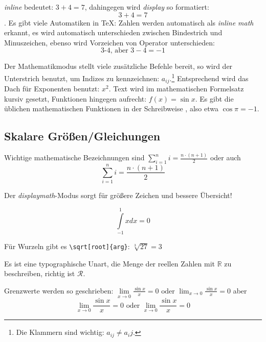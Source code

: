 \documentclass[ngerman,               %
               a4paper,               %
               fleqn,                 %
                     ]{scrartcl}       %
\begin{document}
\textit{inline} bedeutet: \(3+4=7\), dahingegen wird \textit{display} so
formatiert: \[3+4=7\]. Es gibt viele Automatiken in \TeX: Zahlen werden
automatisch als \textit{inline math} erkannt, es wird automatisch
unterschieden zwischen Bindestrich und Minuszeichen, ebenso wird Vorzeichen
von Operator unterschieden:
\[\mbox{3-4, aber } 3-4=-1\]

Der Mathematikmodus stellt viele zusätzliche Befehle bereit, so wird der
Unterstrich benutzt, um Indizes zu kennzeichnen: \(a_{ij}\).\footnote{Die
  Klammern sind wichtig: \(a_{ij} \ne a_ij\).} Entsprechend wird das Dach
für Exponenten benutzt: \(x^{2}\). Text wird im mathematischen Formelsatz
kursiv gesetzt, Funktionen hingegen aufrecht: \(f(x) = \sin x\). Es gibt
die üblichen mathematischen Funktionen in der Schreibweise
\cs{}, also etwa \(\cos \pi = -1\).


\subsection{Skalare Größen/Gleichungen}

Wichtige mathematische Bezeichnungen sind
\(\sum_{i=1}^{n}i=\frac{n\cdot(n+1)}{2}\) oder auch
\[\sum_{i=1}^{n}i=\frac{n\cdot(n+1)}{2}\]

Der \textit{displaymath}-Modus sorgt für größere Zeichen und bessere
Übersicht!

\[\int\limits_{-1}^{1} x dx = 0\]

Für Wurzeln gibt es \lstinline|\sqrt[root]{arg}|: \(\sqrt[3]{27}=3\)

Es ist eine typographische Unart, die Menge der reellen Zahlen mit
\(\mathbb{R}\) zu beschreiben, richtig ist \(\mathcal{R}\).

Grenzwerte werden so geschrieben:
\( \lim\limits_{x\rightarrow0}\frac{\sin x}{x}=0 \mbox{ oder }
\lim_{x\rightarrow0}\frac{\sin x}{x}=0 \) aber
\[
    \lim\limits_{x\rightarrow0}\frac{\sin x}{x}=0 \mbox{ oder }
    \lim_{x\rightarrow0}\frac{\sin x}{x}=0
\]
\end{document}
